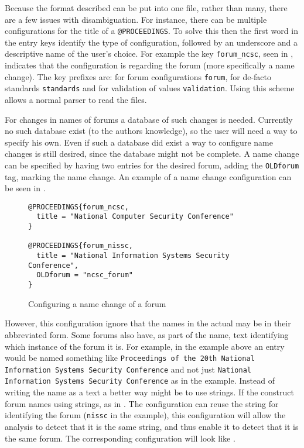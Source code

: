Because the format described can be put into one file, rather than
many, there are a few issues with disambiguation.  For instance, there
can be multiple configurations for the title of a
\texttt{@PROCEEDINGS}.  To solve this then the first word in the entry
keys identify the type of configuration, followed by an underscore and
a descriptive name of the user's choice.  For example the key
\texttt{forum\_ncsc}, seen in
, indicates that the
configuration is regarding the forum (more specifically a name
change).  The key prefixes are: for forum configurations
\texttt{forum}, for de-facto standards \texttt{standards} and for
validation of values \texttt{validation}.  Using this scheme allows a
normal {\bibtex} parser to read the files.

For changes in names of forums a database of such changes is needed.
Currently no such database exist (to the authors knowledge), so the
user will need a way to specify his own.  Even if such a database did
exist a way to configure name changes is still desired, since the
database might not be complete.  A name change can be specified by
having two entries for the desired forum, adding the \texttt{OLDforum}
tag, marking the name change.  An example of a name change
configuration can be seen in
.

\begin{figure}
  \centering
\begin{verbatim}
@PROCEEDINGS{forum_ncsc,
  title = "National Computer Security Conference"
}

@PROCEEDINGS{forum_nissc,
  title = "National Information Systems Security Conference",
  OLDforum = "ncsc_forum"
}
\end{verbatim}
  \caption{Configuring a name change of a forum}
  \label{fig:analyzing_configuration_name_change}
\end{figure}

However, this configuration ignore that the names in the actual
 may be in their abbreviated form.  Some forums also have,
as part of the name, text identifying which instance of the forum it
is.  For example, in the example above an entry would be named
something like \texttt{Proceedings of the 20th National Information
  Systems Security Conference} and not just \texttt{National
  Information Systems Security Conference} as in the example.  Instead
of writing the name as a text a better way might be to use strings.
If the  construct forum names using strings, as in
.
The configuration can reuse the string for identifying the forum
(\texttt{nissc} in the example), this configuration will allow the
analysis to detect that it is the same string, and thus enable it to
detect that it is the same forum.  The corresponding configuration
will look like
.

